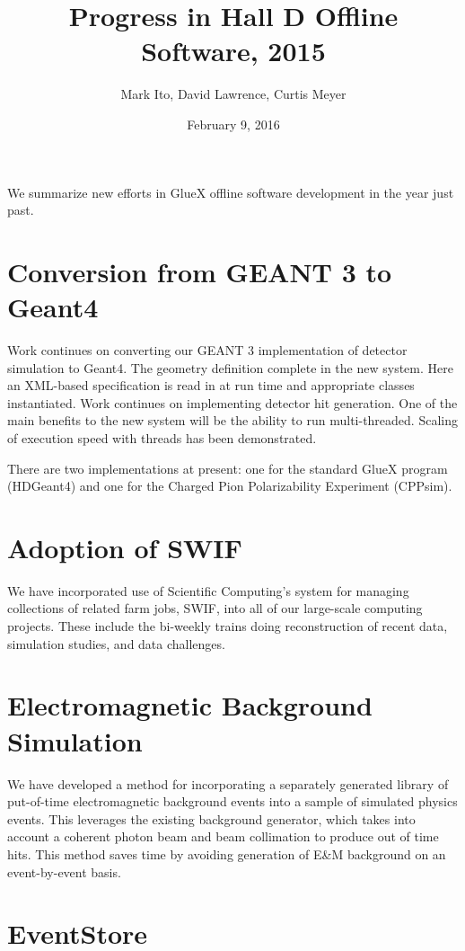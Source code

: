 \documentclass[12pt]{article}
\title{Progress in Hall D Offline Software, 2015}
\author{Mark Ito, David Lawrence, Curtis Meyer}
\date{February 9, 2016}
\begin{document}
\maketitle

We summarize new efforts in GlueX offline software development in the year just past.

\section{Conversion from GEANT 3 to Geant4}

Work continues on converting our GEANT 3 implementation of detector
simulation to Geant4. The geometry definition complete in the new
system. Here an XML-based specification is read in at run time and
appropriate classes instantiated. Work continues on implementing
detector hit generation. One of the main benefits to the new system
will be the ability to run multi-threaded. Scaling of execution speed
with threads has been demonstrated.

There are two implementations at present: one for the standard GlueX
program (HDGeant4)\cite{g4-gluex} and one for the Charged Pion
Polarizability Experiment (CPPsim)\cite{g4-cpp}.

\section{Adoption of SWIF}

We have incorporated use of Scientific Computing's system for managing
collections of related farm jobs, SWIF, into all of our large-scale
computing projects. These include the bi-weekly trains doing reconstruction of
recent data, simulation studies, and data challenges.

\section{Electromagnetic Background Simulation}

We have developed a method for incorporating a separately generated
library of put-of-time electromagnetic background events into a sample
of simulated physics events. This leverages the existing background
generator, which takes into account a coherent photon beam and beam
collimation to produce out of time hits. This method saves time by
avoiding generation of E\&M background on an event-by-event basis.

\section{EventStore}
\end{document}

